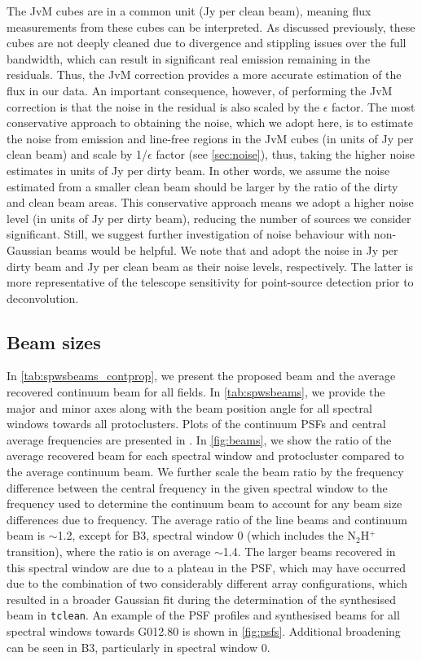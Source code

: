 \documentclass[longauth]{aa} %
\newcommand{\nthp}{\mbox{N$_2$H$^+$}}
\newcommand\tclean{\texttt{tclean}\xspace}
\begin{document}
The JvM cubes are in a common unit (Jy per clean beam), meaning flux measurements from these cubes can be interpreted. As discussed previously, these cubes are not deeply cleaned due to divergence and stippling issues over the full bandwidth, which can result in significant real emission remaining in the residuals. Thus, the JvM correction provides a more accurate estimation of the flux in our data. An important consequence, however, of performing the JvM correction is that the noise in the residual is also scaled by the $\epsilon$ factor. The most conservative approach to obtaining the noise, which we adopt here, is to estimate the noise from emission and line-free regions in the JvM cubes (in units of Jy per clean beam) and scale by 1/$\epsilon$ factor (see \cref{sec:noise}), thus, taking the higher noise estimates in units of Jy per dirty beam. In other words, we assume the noise estimated from a smaller clean beam should be larger by the ratio of the dirty and clean beam areas. This conservative approach means we adopt a higher noise level (in units of Jy per dirty beam), reducing the number of sources we consider significant. Still, we suggest further investigation of noise behaviour with non-Gaussian beams would be helpful. We note that \citet{walter2008} and \citet{Czekala2021} adopt the noise in Jy per dirty beam and Jy per clean beam as their noise levels, respectively. The latter is more representative of the telescope sensitivity for point-source detection prior to deconvolution.



\subsection{Beam sizes}
\label{sec:beamsizes}
In \cref{tab:spwsbeams_contprop}, we present the proposed beam and the average recovered continuum beam for all fields. In \cref{tab:spwsbeams}, we provide the major and minor axes along with the beam position angle for all spectral windows towards all protoclusters. Plots of the continuum PSFs and central average frequencies are presented in \citet{Ginsburg2022}. In \cref{fig:beams}, we show the ratio of the average recovered beam for each spectral window and protocluster compared to the average continuum beam. We further scale the beam ratio by the frequency difference between the central frequency in the given spectral window to the frequency used to determine the continuum beam to account for any beam size differences due to frequency. The average ratio of the line beams and continuum beam is $\sim$1.2, except for B3, spectral window 0 (which includes the \nthp\, transition), where the ratio is on average $\sim$1.4. The larger beams recovered in this spectral window are due to a plateau in the PSF, which may have occurred due to the combination of two considerably different array configurations, which resulted in a broader Gaussian fit during the determination of the synthesised beam in \tclean. An example of the PSF profiles and synthesised beams for all spectral windows towards G012.80 is shown in \cref{fig:psfs}. Additional broadening can be seen in B3, particularly in spectral window 0.
\end{document}
